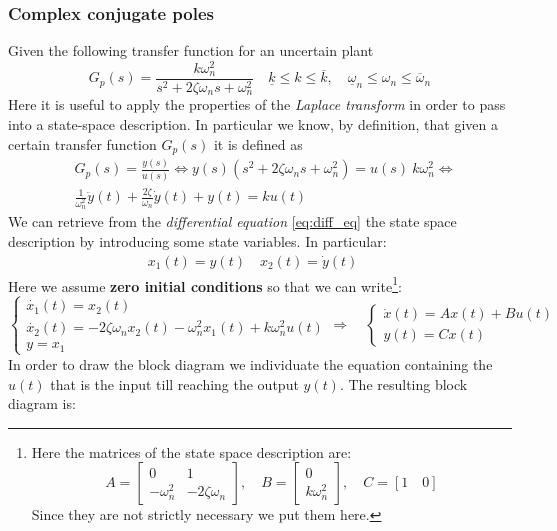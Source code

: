 \documentclass[a4paper, 12pt]{article}
\begin{document}
\subsubsection{Complex conjugate poles}
Given the following transfer function for an uncertain plant
\begin{equation}
    G_p(s)=\frac{k\omega_n^2}{s^2+2\zeta\omega_n{s}+\omega_n^2}\quad
    \underline{k}\le {k} \le \overline{k}, \quad
    \underline{\omega}_n\le {\omega_n} \le \overline{\omega}_n
\end{equation}
Here it is useful to apply the properties of the \textit{Laplace transform} in order to pass into a state-space description. In particular we know, by definition, that given a certain transfer function $G_p(s)$ it is defined as
\begin{align}
    &G_p(s)=\frac{y(s)}{u(s)} \iff y(s) (s^2+2\zeta\omega_n{s}+\omega_n^2)=u(s) \ k\omega_n^2 \iff \\
    &\frac{1}{\omega_n^2}\ddot{y}(t)+\frac{2\zeta}{\omega_n}\dot{y}(t)+y(t)=k{u(t)}\label{eq:diff_eq}
\end{align}
We can retrieve from the \textit{differential equation} \cref{eq:diff_eq} the state space description by introducing some state variables. In particular: 
\begin{align}
    x_1(t)=y(t) \quad
    x_2(t)=\dot{y}(t) \quad
\end{align}
Here we assume \textbf{zero initial conditions} so that we can write\footnote{
    Here the matrices of the state space description are: 
    \begin{equation*}
        A=\begin{bmatrix}
            0&1\\
            -\omega_n^2&-2\zeta\omega_n
        \end{bmatrix}, \quad 
        B=\begin{bmatrix}
            0\\
            k\omega_n^2
        \end{bmatrix}, \quad 
        C=[ 1 \quad 0]
    \end{equation*}
    Since they are not strictly necessary we put them here.
}:
\begin{equation*}
    \begin{cases}
        \dot{x_1}(t)=x_2(t)\\
        \dot{x_2}(t)=-2\zeta\omega_n{x_2}(t)-\omega_n^2{x_1}(t)+k\omega_n^2{u(t)}\\
        y=x_1
    \end{cases} \Longrightarrow \quad \begin{cases}
        \dot{x}(t)=Ax(t)+Bu(t)\\
        y(t)=Cx(t)
    \end{cases} 
\end{equation*}
In order to draw the block diagram we individuate the equation containing the $u(t)$ that is the input till reaching the output $y(t)$. The resulting block diagram is: 
\end{document}
